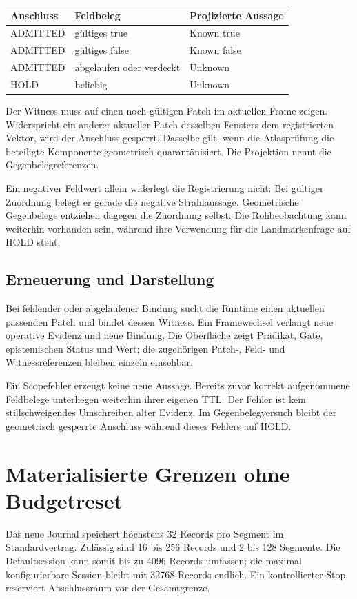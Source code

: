 \documentclass[11pt,a4paper]{article}
\newcommand{\nextsection}[2]{\clearpage{\color{accent}\small\textsf{#1}}\section{#2}}
\begin{document}
\begin{center}\begin{tabular}{@{}lll@{}}\toprule
Anschluss & Feldbeleg & Projizierte Aussage\\\midrule
ADMITTED & gültiges true & Known true\\
ADMITTED & gültiges false & Known false\\
ADMITTED & abgelaufen oder verdeckt & Unknown\\
HOLD & beliebig & Unknown\\\bottomrule
\end{tabular}\end{center}

Der Witness muss auf einen noch gültigen Patch im aktuellen Frame
zeigen. Widerspricht ein anderer aktueller Patch desselben Fensters
dem registrierten Vektor, wird der Anschluss gesperrt. Dasselbe gilt,
wenn die Atlasprüfung die beteiligte Komponente geometrisch
quarantänisiert. Die Projektion nennt die Gegenbelegreferenzen.

Ein negativer Feldwert allein widerlegt die Registrierung nicht:
Bei gültiger Zuordnung belegt er gerade die negative Strahlaussage.
Geometrische Gegenbelege entziehen dagegen die Zuordnung selbst.
Die Rohbeobachtung kann weiterhin vorhanden sein, während ihre
Verwendung für die Landmarkenfrage auf HOLD steht.

\subsection{Erneuerung und Darstellung}
Bei fehlender oder abgelaufener Bindung sucht die Runtime einen
aktuellen passenden Patch und bindet dessen Witness. Ein Framewechsel
verlangt neue operative Evidenz und neue Bindung. Die Oberfläche
zeigt Prädikat, Gate, epistemischen Status und Wert; die zugehörigen
Patch-, Feld- und Witnessreferenzen bleiben einzeln einsehbar.

Ein Scopefehler erzeugt keine neue Aussage. Bereits zuvor korrekt
aufgenommene Feldbelege unterliegen weiterhin ihrer eigenen TTL.
Der Fehler ist kein stillschweigendes Umschreiben alter Evidenz.
Im Gegenbelegversuch bleibt der geometrisch gesperrte Anschluss
während dieses Fehlers auf HOLD.

\nextsection{44 / SEGMENTFORTSETZUNG}{Materialisierte Grenzen ohne Budgetreset}
Das neue Journal speichert höchstens 32 Records pro Segment im
Standardvertrag. Zulässig sind 16 bis 256 Records und 2 bis 128
Segmente. Die Defaultsession kann somit bis zu 4096 Records umfassen;
die maximal konfigurierbare Session bleibt mit 32768 Records endlich.
Ein kontrollierter Stop reserviert Abschlussraum vor der Gesamtgrenze.
\end{document}

